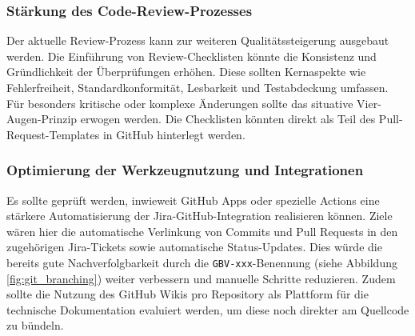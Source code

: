 \documentclass[12pt,oneside]{article}
\begin{document}
    \subsubsection{Stärkung des Code-Review-Prozesses}
    \label{subsubsec:vk_code_review}
    Der aktuelle Review-Prozess kann zur weiteren Qualitätssteigerung ausgebaut werden. Die Einführung von Review-Checklisten könnte die Konsistenz und Gründlichkeit der Überprüfungen erhöhen. Diese sollten Kernaspekte wie Fehlerfreiheit, Standardkonformität, Lesbarkeit und Testabdeckung umfassen. Für besonders kritische oder komplexe Änderungen sollte das situative Vier-Augen-Prinzip erwogen werden. Die Checklisten könnten direkt als Teil des Pull-Request-Templates in GitHub hinterlegt werden.

    \subsubsection{Optimierung der Werkzeugnutzung und Integrationen}
    \label{subsubsec:vk_tool_integration}
    Es sollte geprüft werden, inwieweit GitHub Apps oder spezielle Actions eine stärkere Automatisierung der Jira-GitHub-Integration realisieren können. Ziele wären hier die automatische Verlinkung von Commits und Pull Requests in den zugehörigen Jira-Tickets sowie automatische Status-Updates. Dies würde die bereits gute Nachverfolgbarkeit durch die \texttt{GBV-xxx}-Benennung (siehe Abbildung \ref{fig:git_branching}) weiter verbessern und manuelle Schritte reduzieren. Zudem sollte die Nutzung des GitHub Wikis pro Repository als Plattform für die technische Dokumentation evaluiert werden, um diese noch direkter am Quellcode zu bündeln.
\end{document}

